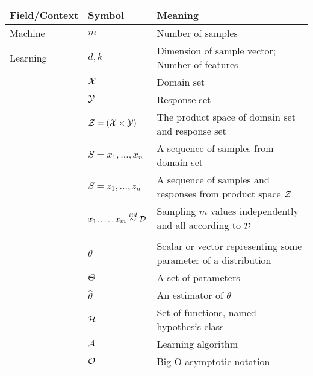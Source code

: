 \begin{table}[h!]
	\begin{center}
		\begin{tabular}{l|l|l}
			\textbf{Field/Context} & \textbf{Symbol} & \textbf{Meaning} \\
			\hline
			Machine&$m$ & Number of samples \\
			Learning&$d, k$ & Dimension of sample vector; Number of features \\
			&$\mathcal{X}$ & Domain set \\
			&$\mathcal{Y}$ & Response set \\
			&$\mathcal{Z}=\left(\mathcal{X}\times\mathcal{Y}\right)$& The product space of domain set and response set\\
			&$S=x_1,\ldots,x_n$ & A sequence of samples from domain set \\
			&$S=z_1,\ldots,z_n$ & A sequence of samples and responses from product space $\mathcal{Z}$ \\
			&$x_1,\ldots,x_m\overset{iid}{\sim}\mathcal{D}$& Sampling $m$ values independently and all according to $\mathcal{D}$\\
			&&\\
			&$\theta$&Scalar or vector representing some parameter of a distribution\\
			&$\Theta$&A set of parameters\\
			&$\widehat{\theta}$& An estimator of $\theta$\\
			&$\mathcal{H}$&Set of functions, named hypothesis class\\
			&$\mathcal{A}$&Learning algorithm\\
			&$\mathcal{O}$&Big-O asymptotic notation\\
			\hline
		\end{tabular}
	\end{center}
\end{table}

\vspace*{\fill}